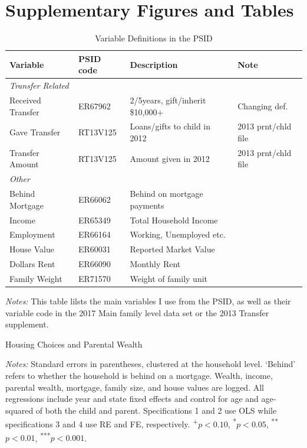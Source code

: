 \documentclass[12pt]{article}
\begin{document}
\section{Supplementary Figures and Tables}
\begin{table}
	\small	
	\caption{Variable Definitions in the PSID}\label{tab:vardef}
	\begin{threeparttable}
	\begin{tabular}{@{}llll@{}}
		\toprule
		Variable& PSID code & Description & Note \\ \midrule
		\textit{Transfer Related} \\ 
		Received Transfer & ER67962 & 2/5years, gift/inherit \$10,000+ & Changing def. \\
		Gave Transfer & RT13V125 & Loans/gifts to child in 2012 & 2013
		prnt/chld file \\ 
		Transfer Amount & RT13V125 & Amount given in 2012 & 2013 prnt/chld file \\
		\textit{Other} \\ 
		Behind Mortgage & ER66062 & Behind on mortgage payments\\
		Income & ER65349 & Total Household Income & \\
		Employment & ER66164 & Working, Unemployed etc. \\
		House Value & ER60031 & Reported Market Value & \\
		Dollars Rent &	ER66090 & Monthly Rent\\
		Family Weight &		ER71570 & Weight of family unit & \\
		\bottomrule
	\end{tabular}
	{\textit{Notes:} This table lilsts the main variables I use from the PSID, as well as their variable code in the 2017 Main family level data set or the 2013 Transfer supplement.}
	\end{threeparttable}
	
\end{table}

\begin{table}
	\centering
	\begin{threeparttable}
		\caption{Housing Choices and Parental Wealth}
		\label{tab:hypo_long}
		\small 
				
	
	\end{threeparttable}
	{\begin{footnotesize}\begin{flushleft}
		\textit{Notes:} Standard errors in parentheses, clustered at the household level. `Behind' refers to whether the household is behind on a mortgage. Wealth, income, parental wealth, mortgage, family size, and house values are logged. All regressions include year and state fixed effects and control for age and age-squared of both the child and parent. Specifications 1 and 2 use OLS while specifications 3 and 4 use RE and FE, respectively. \textsuperscript{+}$p<0.10$, \textsuperscript{*}$p<0.05$, \textsuperscript{**}$p<0.01$, \textsuperscript{***}$p<0.001$.
		\end{flushleft}\end{footnotesize}}	
\end{table}
\end{document}
